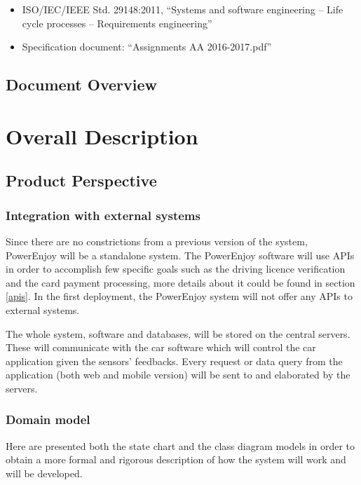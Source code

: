 \documentclass[english]{article}
\begin{document}
\begin{itemize}
	\item{ISO/IEC/IEEE Std. 29148:2011, “Systems and software engineering -- Life cycle processes -- Requirements engineering”}
	\item{Specification document: “Assignments AA 2016-2017.pdf”}
\end{itemize}

\subsection{Document Overview}

\newpage{}

\section{Overall Description}

\subsection{Product Perspective}

\subsubsection{Integration with external systems}

Since there are no constrictions from a previous version of the system, PowerEnjoy will be a standalone system.
The PowerEnjoy software will use APIs in order to accomplish few specific goals such as the driving licence verification and the card payment processing, more details about it could be found in section \ref{apis}.
In the first deployment, the PowerEnjoy system will not offer any APIs to external systems.

The whole system, software and databases, will be stored on the central servers. These will communicate with the car software which will control the car application given the sensors' feedbacks.
Every request or data query from the application (both web and mobile version) will be sent to and elaborated by the servers.

\subsubsection{Domain model}

Here are presented both the state chart and the class diagram models in order to obtain a more formal and rigorous description of how the system will work and will be developed.
\end{document}
